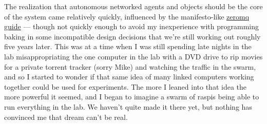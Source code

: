 The realization that autonomous networked agents and objects should be the core of the system came relatively quickly, influenced by the manifesto-like \href{https://zguide.zeromq.org/}{zeromq guide} --- though not quickly enough to avoid my inexperience with programming baking in some incompatible design decisions that we're still working out roughly five years later. This was at a time when I was still spending late nights in the lab misappropriating the one computer in the lab with a DVD drive to rip movies for a private torrent tracker (sorry Mike) and watching the traffic in the swarm, and so I started to wonder if that same idea of many linked computers working together could be used for experiments.  The more I leaned into that idea the more powerful it seemed, and I began to imagine a swarm of raspis being able to run everything in the lab. We haven't quite made it there yet, but nothing has convinced me that dream can't be real.